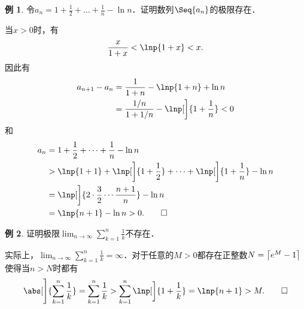 \documentclass[a4paper,punct=CCT]{ctexbook}
\makeatletter
\theoremstyle{definition}
\newtheorem*{example*}{例}
\theoremstyle{remark}
\renewcommand*{\proofname}{证}
\renewenvironment{proof}[1][\proofname]{\par
  \pushQED{\qed}%
  \normalfont \topsep6\p@\@plus6\p@\relax
  \trivlist
  \item[\hskip\labelsep
    \bfseries
    #1%
    ]\ignorespaces
}{%
  \popQED\endtrivlist\@endpefalse
}
\makeatother
\begin{document}
\begin{example*}
  令\(\displaystyle a_n = 1 + \frac12 + \dots + \frac1n - \ln n\)．证明数列\(\Seq{a_n}\)的极限存在．\rule{0ex}{3.5ex}

  \begin{proof}
    当\(x > 0\)时，有
    \begin{equation*}
      \frac{x}{1+x} < \lnp{1+x} < x.
    \end{equation*}
    因此有
    \begin{align*}
      a_{n+1} - a_n
      &= \frac{1}{1+n} - \lnp{1+n} + \ln n \\
      &= \frac{1/n}{1+1/n} - \lnp[\bigg]{1+\frac1n} < 0
    \end{align*}
    和
    \begin{align*}
      a_n
      &= 1 + \frac12 + \dots + \frac1n - \ln n \\
      &> \lnp{1+1} + \lnp[\bigg]{1+\frac12} + \dots + \lnp[\bigg]{1+\frac1n} - \ln n \\
      &= \lnp[\bigg]{2 \cdot \frac32 \dotsm \frac{n+1}{n}} - \ln n \\
      &= \lnp{n + 1} - \ln n > 0. \qedhere
    \end{align*}
  \end{proof}
\end{example*}

\begin{example*}
  证明极限\(\displaystyle \lim_{n\to\infty} \sum_{k=1}^n \frac1k\)不存在．

  \begin{proof}
    实际上，\(\displaystyle \lim_{n\to\infty} \sum_{k=1}^n \frac1k = \infty\)．对于任意的\(M > 0\)都存在正整数\(N = \ceil[\big]{e^M-1}\)使得当\(n > N\)时都有
    \begin{equation*}
      \abs[\Bigg]{\sum_{k=1}^n \frac1k}
      = \sum_{k=1}^n \frac1k
      > \sum_{k=1}^n \lnp[\bigg]{1+\frac1k}
      = \lnp{n+1} > M.
      \qedhere
    \end{equation*}
  \end{proof}
\end{example*}
\end{document}

